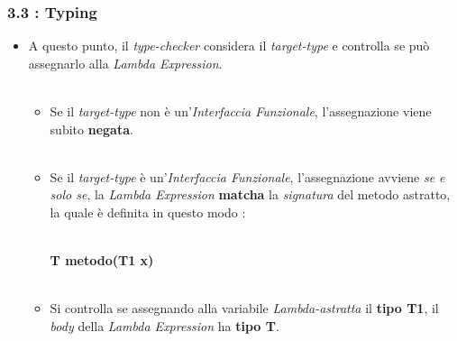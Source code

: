 \documentclass{beamer}
\begin{document}

\begin{frame}
	\frametitle{\textbf{3.3 : Typing}}
	\begin{itemize}
		\item
			A questo punto, il \textit{type-checker} considera il \textit{target-type} e controlla se può assegnarlo alla \textit{Lambda Expression}.\\\
			\begin{itemize}
				\item
					Se il \textit{target-type} non è un'\textit{Interfaccia Funzionale}, l'assegnazione viene subito \textbf{negata}.\\\
				\item
					Se il \textit{target-type} è un'\textit{Interfaccia Funzionale}, l'assegnazione avviene \textit{se e solo se}, la \textit{Lambda Expression} \textbf{matcha} la \textit{signatura} del metodo astratto, la quale è definita in questo modo :\\\
					\begin{center}
						\textbf{T metodo(T1 x)}\\\
					\end{center}
				\item
					Si controlla se assegnando alla variabile \textit{Lambda-astratta} il \textbf{tipo T1}, il \textit{body} della \textit{Lambda Expression} ha \textbf{tipo T}.
			\end{itemize}
	\end{itemize}
\end{frame}

\end{document}

